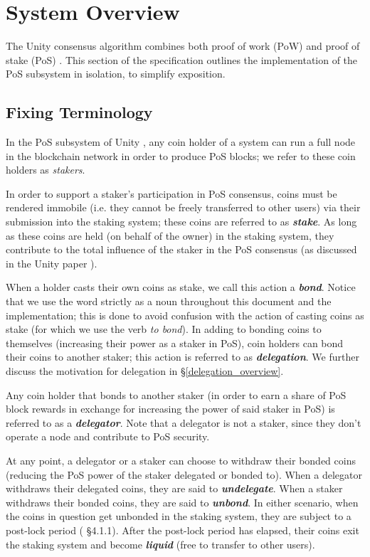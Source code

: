 \section{System Overview}

The Unity consensus algorithm combines both proof of work (PoW) and proof of stake (PoS) \cite{WZS19}. This section of the specification outlines the implementation of the PoS subsystem in isolation, to simplify exposition.

\subsection{Fixing Terminology}
In the PoS subsystem of Unity \cite{WZS19}, any coin holder of a system can run a full node in the blockchain network in order to produce PoS blocks; we refer to these coin holders as \textit{stakers}.

In order to support a staker's participation in PoS consensus, coins must be rendered immobile (i.e. they cannot be freely transferred to other users) via their submission into the staking system; these coins are referred to as \textbf{\textit{stake}}. As long as these coins are held (on behalf of the owner) in the staking system, they contribute to the total influence of the staker in the PoS consensus (as discussed in the Unity paper \cite{WZS19}). 

When a holder casts their own coins as stake, we call this action a \textbf{\textit{bond}}. Notice that we use the word  strictly as a noun throughout this document and the implementation; this is done to avoid confusion with the action of casting coins as stake (for which we use the verb \textit{to bond}). 
In adding to bonding coins to themselves (increasing their power as a staker in PoS), coin holders can bond their coins to another staker; this action is referred to as \textbf{\textit{delegation}}. We further discuss the motivation for delegation in \S\ref{delegation_overview}.

Any coin holder that bonds to another staker (in order to earn a share of PoS block rewards in exchange for increasing the power of said staker in PoS) is referred to as a \textbf{\textit{delegator}}. Note that a delegator is not a staker, since they don't operate a node and contribute to PoS security.

At any point, a delegator or a staker can choose to withdraw their bonded coins (reducing the PoS power of the staker delegated or bonded to). When a delegator withdraws their delegated coins, they are said to \textbf{\textit{undelegate}}. When a staker withdraws their bonded coins, they are said to \textbf{\textit{unbond}}. In either scenario, when the coins in question get unbonded in the staking system, they are subject to a post-lock period (\cite{WZS19} \S4.1.1). After the post-lock period has elapsed, their coins exit the staking system and become \textbf{\textit{liquid}} (free to transfer to other users). 

